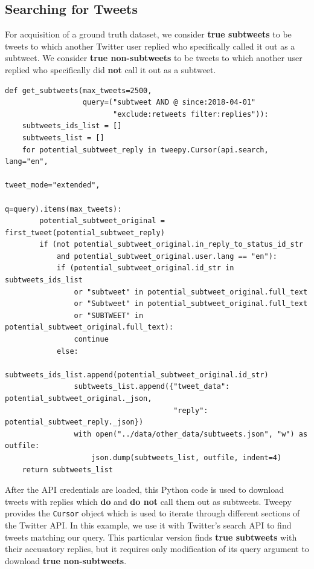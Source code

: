 \documentclass[11pt, twoside, reqno]{book}
\begin{document}
\subsection{Searching for Tweets}
\label{searching_with_api}

For acquisition of a ground truth dataset, we consider \textbf{true subtweets} to be tweets to which another Twitter user replied who specifically called it out as a subtweet. We consider \textbf{true non-subtweets} to be tweets to which another user replied who specifically did \textbf{not} call it out as a subtweet.

\begin{verbatim}
def get_subtweets(max_tweets=2500,
                  query=("subtweet AND @ since:2018-04-01"
                         "exclude:retweets filter:replies")):
    subtweets_ids_list = []
    subtweets_list = []
    for potential_subtweet_reply in tweepy.Cursor(api.search, lang="en",
                                                  tweet_mode="extended",
                                                  q=query).items(max_tweets):
        potential_subtweet_original = first_tweet(potential_subtweet_reply)
        if (not potential_subtweet_original.in_reply_to_status_id_str
            and potential_subtweet_original.user.lang == "en"):
            if (potential_subtweet_original.id_str in subtweets_ids_list
                or "subtweet" in potential_subtweet_original.full_text
                or "Subtweet" in potential_subtweet_original.full_text
                or "SUBTWEET" in potential_subtweet_original.full_text):
                continue
            else:
                subtweets_ids_list.append(potential_subtweet_original.id_str)
                subtweets_list.append({"tweet_data": potential_subtweet_original._json,
                                       "reply": potential_subtweet_reply._json})
                with open("../data/other_data/subtweets.json", "w") as outfile:
                    json.dump(subtweets_list, outfile, indent=4)
    return subtweets_list
\end{verbatim}
\noindent
After the API credentials are loaded, this Python code is used to download tweets with replies which \textbf{do} and \textbf{do not} call them out as subtweets. Tweepy provides the \verb|Cursor| object which is used to iterate through different sections of the Twitter API. In this example, we use it with Twitter's search API to find tweets matching our query. This particular version finds \textbf{true subtweets} with their accusatory replies, but it requires only modification of its query argument to download \textbf{true non-subtweets}.
\end{document}
